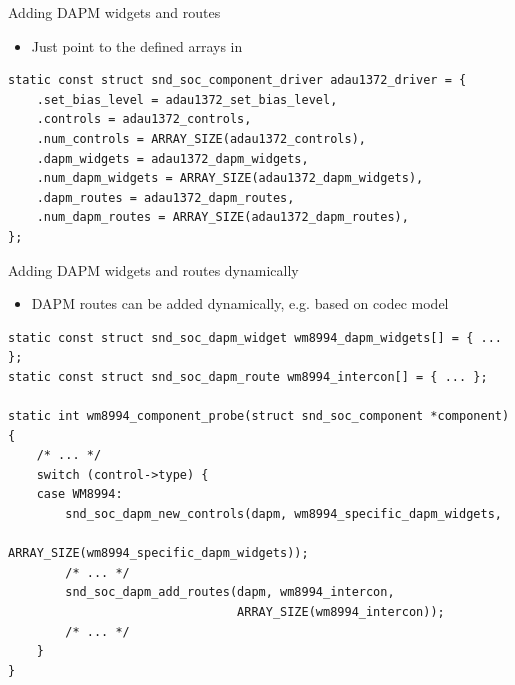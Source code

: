 \begin{frame}[fragile]{Adding DAPM widgets and routes}
  \begin{itemize}
  \item Just point to the defined arrays in
  \end{itemize}
  \begin{block}{}
    \fontsize{9}{9}\selectfont
    \begin{verbatim}
static const struct snd_soc_component_driver adau1372_driver = {
    .set_bias_level = adau1372_set_bias_level,
    .controls = adau1372_controls,
    .num_controls = ARRAY_SIZE(adau1372_controls),
    .dapm_widgets = adau1372_dapm_widgets,
    .num_dapm_widgets = ARRAY_SIZE(adau1372_dapm_widgets),
    .dapm_routes = adau1372_dapm_routes,
    .num_dapm_routes = ARRAY_SIZE(adau1372_dapm_routes),
};
    \end{verbatim}
  \end{block}
\end{frame}

\begin{frame}[fragile]{Adding DAPM widgets and routes dynamically}
  \begin{itemize}
  \item DAPM routes can be added dynamically, e.g. based on codec model
  \end{itemize}
  \begin{block}{}
    \fontsize{9}{9}\selectfont
    \begin{verbatim}
static const struct snd_soc_dapm_widget wm8994_dapm_widgets[] = { ... };
static const struct snd_soc_dapm_route wm8994_intercon[] = { ... };

static int wm8994_component_probe(struct snd_soc_component *component)
{
    /* ... */
    switch (control->type) {
    case WM8994:
        snd_soc_dapm_new_controls(dapm, wm8994_specific_dapm_widgets,
                                  ARRAY_SIZE(wm8994_specific_dapm_widgets));
        /* ... */
        snd_soc_dapm_add_routes(dapm, wm8994_intercon,
                                ARRAY_SIZE(wm8994_intercon));
        /* ... */
    }
}
    \end{verbatim}
  \end{block}
\end{frame}

